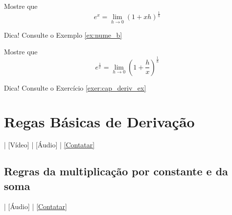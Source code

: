 \begin{exer}\label{exer:cap_deriv_ex}
  Mostre que
  \begin{equation}
    e^x = \lim_{h\to 0}\left(1 + xh\right)^{\frac{1}{h}}
  \end{equation}
\end{exer}
\begin{resp}
  Dica! Consulte o Exemplo \ref{ex:nume_b}
\end{resp}

\begin{exer}\label{exer:cap_deriv_defe1ox}
  Mostre que
  \begin{equation}
    e^{\frac{1}{x}} = \lim_{h\to 0}\left(1 + \frac{h}{x}\right)^{\frac{1}{h}}
  \end{equation}
\end{exer}
\begin{resp}
  Dica! Consulte o Exercício \ref{exer:cap_deriv_ex}
\end{resp}

\section{Regas Básicas de Derivação}\label{cap_deriv_sec_regrasderiv}

\begin{flushright}
  [YouTube] | [Vídeo] | [Áudio] | \href{https://phkonzen.github.io/notas/contato.html}{[Contatar]}
\end{flushright}

\subsection{Regras da multiplicação por constante e da soma}\label{subsec:deriv_rmcs}

\begin{flushright}
  [Vídeo] | [Áudio] | \href{https://phkonzen.github.io/notas/contato.html}{[Contatar]}
\end{flushright}

